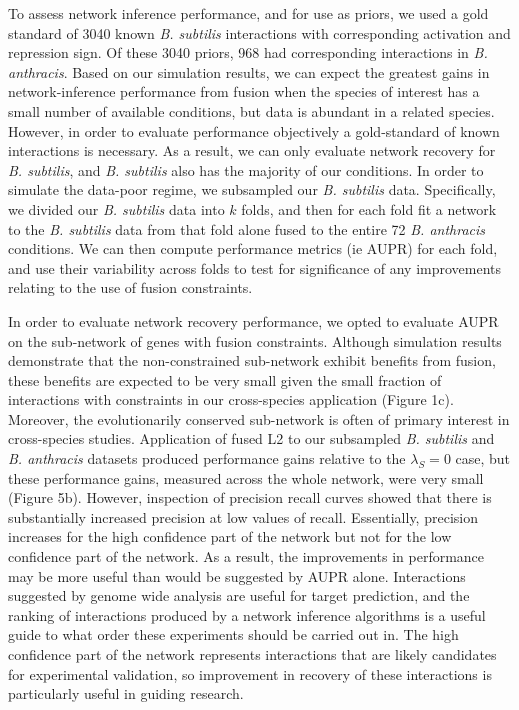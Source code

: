 \documentclass[11pt]{article}
\begin{document}
To assess network inference performance, and for use as priors, we used a gold standard of 3040 known \textit{B. subtilis} interactions with corresponding activation and repression sign. Of these 3040 priors, 968 had corresponding interactions in \textit{B. anthracis}. Based on our simulation results, we can expect the greatest gains in network-inference performance from fusion when the species of interest has a small number of available conditions, but data is abundant in a related species. However, in order to evaluate performance objectively a gold-standard of known interactions is necessary. As a result, we can only evaluate network recovery for \textit{B. subtilis}, and \textit{B. subtilis} also has the majority of our conditions. In order to simulate the data-poor regime, we subsampled our \textit{B. subtilis} data. Specifically, we divided our \textit{B. subtilis} data into $k$ folds, and then for each fold fit a network to the \textit{B. subtilis} data from that fold alone fused to the entire 72 \textit{B. anthracis} conditions. We can then compute performance metrics (ie AUPR) for each fold, and use their variability across folds to test for significance of any improvements relating to the use of fusion constraints. 

In order to evaluate network recovery performance, we opted to evaluate AUPR on the sub-network of genes with fusion constraints. Although simulation results demonstrate that the non-constrained sub-network exhibit benefits from fusion, these benefits are expected to be very small given the small fraction of interactions with constraints in our cross-species application (Figure 1c). Moreover, the evolutionarily conserved sub-network is often of primary interest in cross-species studies. Application of fused L2 to our subsampled \textit{B. subtilis} and \textit{B. anthracis} datasets produced performance gains relative to the $\lambda_S=0$ case, but these performance gains, measured across the whole network, were very small (Figure 5b). However, inspection of precision recall curves showed that there is substantially increased precision at low values of recall. Essentially, precision increases for the high confidence part of the network but not for the low confidence part of the network. As a result, the improvements in performance may be more useful than would be suggested by AUPR alone. Interactions suggested by genome wide analysis are useful for target prediction, and the ranking of interactions produced by a network inference algorithms is a useful guide to what order these experiments should be carried out in. The high confidence part of the network represents interactions that are likely candidates for experimental validation, so improvement in recovery of these interactions is particularly useful in guiding research. 
\end{document}
